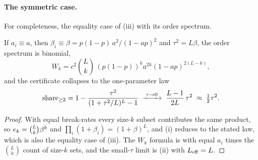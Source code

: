 
\paragraph{The symmetric case.} For completeness, the equality case of \propfive(iii) with its order
spectrum.

\begin{corollary*}
If $a_i \equiv a$, then $\beta_i \equiv \beta = p(1-p)\,a^2/(1-ap)^2$ and $\tau^2 = L\beta$, the order
spectrum is binomial,
\[
  W_k = c^2\binom{L}{k}\,(p(1-p))^k a^{2k}(1-ap)^{2(L-k)},
\]
and the certificate collapses to the one-parameter law
\[
  \mathrm{share}_{\ge 2} = 1 - \frac{\tau^2}{(1+\tau^2/L)^L - 1}
  \;\xrightarrow{\;\tau\to 0\;}\; \frac{L-1}{2L}\,\tau^2 \;\approx\; \tfrac{1}{2}\tau^2 .
\]
\end{corollary*}

\begin{proof}
With equal break-rates every size-$k$ subset contributes the same product, so
$e_{k} = \binom{L}{k}\beta^k$ and $\prod_i(1+\beta_i) = (1+\beta)^L$, and \propfive(i) reduces to the
stated law, which is also the equality case of \propfive(iii). The $W_k$ formula is \thmfour{} with
equal $a_i$ times the $\binom{L}{k}$ count of size-$k$ sets, and the small-$\tau$ limit is
\propfive(ii) with $L_{\mathrm{eff}} = L$.
\end{proof}

